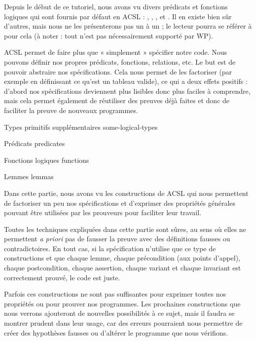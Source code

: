 
Depuis le début de ce tutoriel, nous avons vu divers prédicats et fonctions
logiques qui sont fournis par défaut en ACSL : , ,
,  et . Il en existe bien sûr d'autres, mais
nous ne les présenterons pas un à un ; le lecteur pourra se référer à
pour cela (à noter : tout n'est pas nécessairement supporté par WP).



ACSL permet de faire plus que « simplement » spécifier notre code. Nous
pouvons définir nos propres prédicats, fonctions, relations, etc. Le but est de
pouvoir abstraire nos spécifications. Cela nous permet de les factoriser (par
exemple en définissant ce qu'est un tableau valide), ce qui a deux effets
positifs : d'abord nos spécifications deviennent plus lisibles donc
plus faciles à comprendre, mais cela permet également de réutiliser des preuves
déjà faites et donc de faciliter la preuve de nouveaux programmes.


\begin{levelTwo}
  {Types primitifs supplémentaires}
  {some-logical-types}
\end{levelTwo}

\begin{levelTwo}
  {Prédicats}
  {predicates}
\end{levelTwo}

\begin{levelTwo}
  {Fonctions logiques}
  {functions}
\end{levelTwo}

\begin{levelTwo}
  {Lemmes}
  {lemmas}
\end{levelTwo}



\horizontalLine



Dans cette partie, nous avons vu les constructions de ACSL qui nous permettent
de factoriser un peu nos spécifications et d'exprimer des propriétés générales
pouvant être utilisées par les prouveurs pour faciliter leur travail.



Toutes les techniques expliquées dans cette partie sont sûres, au sens où
elles ne permettent \textit{a priori} pas de fausser la preuve avec des définitions
fausses ou contradictoires. En tout cas, si la spécification n'utilise que ce
type de constructions et que chaque lemme, chaque précondition (aux points
d'appel), chaque postcondition, chaque assertion, chaque variant et chaque
invariant est correctement prouvé, le code est juste.



Parfois ces constructions ne sont pas suffisantes pour exprimer toutes nos
propriétés ou pour prouver nos programmes. Les prochaines constructions que nous
verrons ajouteront de nouvelles possibilités à ce sujet, mais il
faudra se montrer prudent dans leur usage, car des erreurs pourraient nous
permettre de créer des hypothèses fausses ou d'altérer le programme que nous
vérifions.
